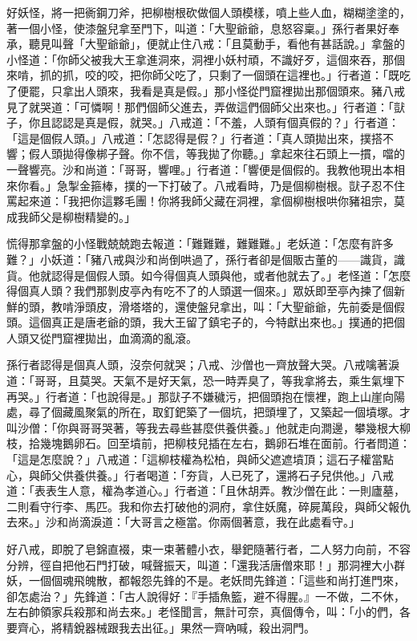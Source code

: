 好妖怪，將一把衠鋼刀斧，把柳樹根砍做個人頭模樣，噴上些人血，糊糊塗塗的，著一個小怪，使漆盤兒拿至門下，叫道：「大聖爺爺，息怒容稟。」孫行者果好奉承，聽見叫聲「大聖爺爺」，便就止住八戒：「且莫動手，看他有甚話說。」拿盤的小怪道：「你師父被我大王拿進洞來，洞裡小妖村頑，不識好歹，這個來吞，那個來啃，抓的抓，咬的咬，把你師父吃了，只剩了一個頭在這裡也。」行者道：「既吃了便罷，只拿出人頭來，我看是真是假。」那小怪從門窟裡拋出那個頭來。豬八戒見了就哭道：「可憐啊！那們個師父進去，弄做這們個師父出來也。」行者道：「獃子，你且認認是真是假，就哭。」八戒道：「不羞，人頭有個真假的？」行者道：「這是個假人頭。」八戒道：「怎認得是假？」行者道：「真人頭拋出來，撲搭不響；假人頭拋得像梆子聲。你不信，等我拋了你聽。」拿起來往石頭上一摜，噹的一聲響亮。沙和尚道：「哥哥，響哩。」行者道：「響便是個假的。我教他現出本相來你看。」急掣金箍棒，撲的一下打破了。八戒看時，乃是個柳樹根。獃子忍不住罵起來道：「我把你這夥毛團！你將我師父藏在洞裡，拿個柳樹根哄你豬祖宗，莫成我師父是柳樹精變的。」

慌得那拿盤的小怪戰兢兢跑去報道：「難難難，難難難。」老妖道：「怎麼有許多難？」小妖道：「豬八戒與沙和尚倒哄過了，孫行者卻是個販古董的——識貨，識貨。他就認得是個假人頭。如今得個真人頭與他，或者他就去了。」老怪道：「怎麼得個真人頭？我們那剝皮亭內有吃不了的人頭選一個來。」眾妖即至亭內揀了個新鮮的頭，教啃淨頭皮，滑塔塔的，還使盤兒拿出，叫：「大聖爺爺，先前委是個假頭。這個真正是唐老爺的頭，我大王留了鎮宅子的，今特獻出來也。」撲通的把個人頭又從門窟裡拋出，血滴滴的亂滾。

孫行者認得是個真人頭，沒奈何就哭；八戒、沙僧也一齊放聲大哭。八戒噙著淚道：「哥哥，且莫哭。天氣不是好天氣，恐一時弄臭了，等我拿將去，乘生氣埋下再哭。」行者道：「也說得是。」那獃子不嫌穢污，把個頭抱在懷裡，跑上山崖向陽處，尋了個藏風聚氣的所在，取釘鈀築了一個坑，把頭埋了，又築起一個墳塚。才叫沙僧：「你與哥哥哭著，等我去尋些甚麼供養供養。」他就走向澗邊，攀幾根大柳枝，拾幾塊鵝卵石。回至墳前，把柳枝兒插在左右，鵝卵石堆在面前。行者問道：「這是怎麼說？」八戒道：「這柳枝權為松柏，與師父遮遮墳頂；這石子權當點心，與師父供養供養。」行者喝道：「夯貨，人已死了，還將石子兒供他。」八戒道：「表表生人意，權為孝道心。」行者道：「且休胡弄。教沙僧在此：一則廬墓，二則看守行李、馬匹。我和你去打破他的洞府，拿住妖魔，碎屍萬段，與師父報仇去來。」沙和尚滴淚道：「大哥言之極當。你兩個著意，我在此處看守。」

好八戒，即脫了皂錦直裰，束一束著體小衣，舉鈀隨著行者，二人努力向前，不容分辨，徑自把他石門打破，喊聲振天，叫道：「還我活唐僧來耶！」那洞裡大小群妖，一個個魂飛魄散，都報怨先鋒的不是。老妖問先鋒道：「這些和尚打進門來，卻怎處治？」先鋒道：「古人說得好：『手插魚籃，避不得腥。』一不做，二不休，左右帥領家兵殺那和尚去來。」老怪聞言，無計可奈，真個傳令，叫：「小的們，各要齊心，將精銳器械跟我去出征。」果然一齊吶喊，殺出洞門。


